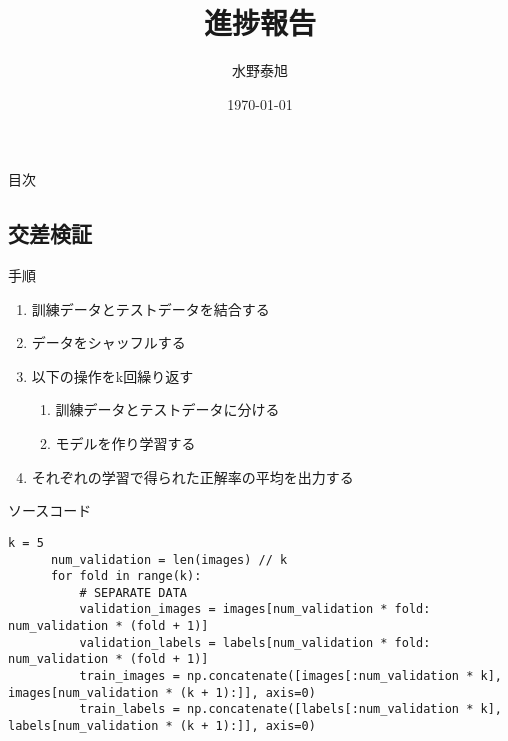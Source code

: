 \documentclass[dvipdfmx]{beamer}
\title{進捗報告}
\date{\today}
\author{水野泰旭}
\institute{弘前大学理工学部電子情報工学科４年}
\begin{document}
  \maketitle

  \begin{frame}{目次}
    \tableofcontents
   \end{frame}
  
  \begin{frame}
    \section{交差検証}
  \end{frame}

  \begin{frame}{手順}
    \begin{enumerate}
      \item 訓練データとテストデータを結合する
      \item データをシャッフルする
      \item 以下の操作をk回繰り返す
      \begin{enumerate}
        \item 訓練データとテストデータに分ける
        \item モデルを作り学習する
      \end{enumerate}
      \item それぞれの学習で得られた正解率の平均を出力する
    \end{enumerate}
  \end{frame}

  \begin{frame}[fragile]{ソースコード}
    \begin{lstlisting}[caption=ksparate\_train.py]
      k = 5
      num_validation = len(images) // k
      for fold in range(k):
          # SEPARATE DATA
          validation_images = images[num_validation * fold: num_validation * (fold + 1)]
          validation_labels = labels[num_validation * fold: num_validation * (fold + 1)]
          train_images = np.concatenate([images[:num_validation * k], images[num_validation * (k + 1):]], axis=0)
          train_labels = np.concatenate([labels[:num_validation * k], labels[num_validation * (k + 1):]], axis=0)
      \end{lstlisting}
  \end{frame}
\end{document}
